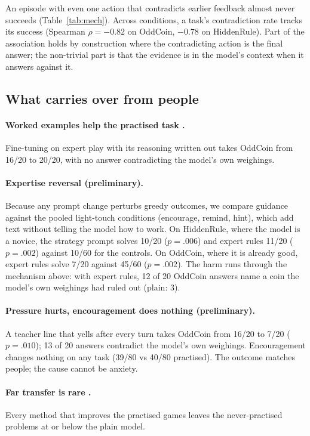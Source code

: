 \documentclass[11pt]{article}
\begin{document}
An episode with even one action that contradicts earlier feedback almost never succeeds (Table~\ref{tab:mech}).
Across conditions, a task's contradiction rate tracks its success (Spearman $\rho=-0.82$ on OddCoin, $-0.78$ on
HiddenRule). Part of the association holds by construction where the contradicting action is the final answer;
the non-trivial part is that the evidence is in the model's context when it answers against it.

\subsection{What carries over from people}
\paragraph{Worked examples help the practised task \citep{sweller1985}.} Fine-tuning on expert play with its
reasoning written out takes OddCoin from 16/20 to 20/20, with no answer contradicting the model's own weighings.

\paragraph{Expertise reversal \citep{kalyuga2003} (preliminary).} Because any prompt change perturbs greedy
outcomes, we compare guidance against the pooled light-touch conditions (encourage, remind, hint), which add text
without telling the model how to work. On HiddenRule, where the model is a novice, the strategy prompt solves 10/20
($p=.006$) and expert rules 11/20 ($p=.002$) against 10/60 for the controls. On OddCoin, where it is already good,
expert rules solve 7/20 against 45/60 ($p=.002$). The harm runs through the mechanism above: with expert rules, 12
of 20 OddCoin answers name a coin the model's own weighings had ruled out (plain: 3).

\paragraph{Pressure hurts, encouragement does nothing \citep{yerkes1908,sisk2018} (preliminary).} A teacher line
that yells after every turn takes OddCoin from 16/20 to 7/20 ($p=.010$); 13 of 20 answers contradict the model's
own weighings. Encouragement changes nothing on any task (39/80 vs 40/80 practised). The outcome matches people;
the cause cannot be anxiety.

\paragraph{Far transfer is rare \citep{thorndike1901,barnett2002}.} Every method that improves the practised games
leaves the never-practised problems at or below the plain model.
\end{document}
